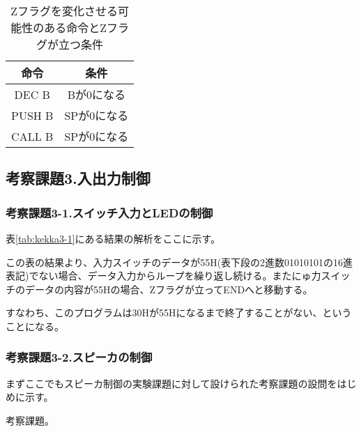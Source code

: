 \documentclass[11pt,a4j]{jsarticle}
\begin{document}
\begin{enumerate}
   \begin{table}[htb]
  \begin{center}
    \caption{Zフラグを変化させる可能性のある命令とZフラグが立つ条件}
    \begin{tabular}{c|c} 
命令 & 条件 \\ \hline
DEC B & Bが0になる \\
PUSH B & SPが0になる \\
CALL B & SPが0になる \\
    \end{tabular}
    \label{tab:kousatu2-3}
  \end{center}
 \end{table}
   
   \end{enumerate}
  
  
  \subsection{考察課題3.入出力制御}
  
   \subsubsection{考察課題3-1.スイッチ入力とLEDの制御}
   
   表\ref{tab:kekka3-1}にある結果の解析をここに示す。
   
   この表の結果より、入力スイッチのデータが55H(表下段の2進数01010101の16進表記)でない場合、データ入力からループを繰り返し続ける。またにゅ力スイッチのデータの内容が55Hの場合、Zフラグが立ってENDへと移動する。
   
   すなわち、このプログラムは30Hが55Hになるまで終了することがない、ということになる。
   
   \subsubsection{考察課題3-2.スピーカの制御}
   
   まずここでもスピーカ制御の実験課題に対して設けられた考察課題の設問をはじめに示す。
   
   考察課題。
   
\end{document}
